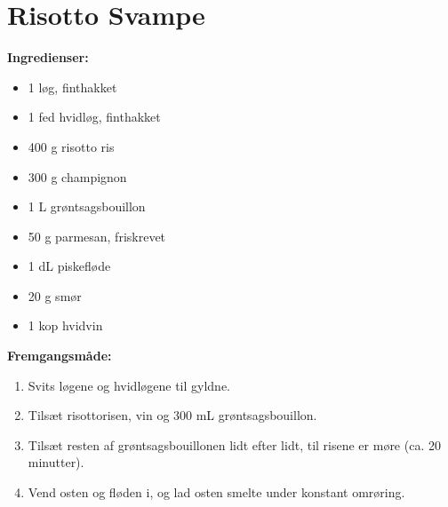 \documentclass{book}
\begin{document}
\section{Risotto Svampe}
\begin{minipage}[t]{0.5\textwidth}
\textbf{Ingredienser:}
\begin{itemize}
    \item 1 løg, finthakket
    \item 1 fed hvidløg, finthakket
    \item 400 g risotto ris
    \item 300 g champignon
    \item 1 L grøntsagsbouillon
    \item 50 g parmesan, friskrevet
    \item 1 dL piskefløde
    \item 20 g smør
    \item 1 kop hvidvin
\end{itemize}
\end{minipage}
\begin{minipage}[t]{0.5\textwidth}
\textbf{Fremgangsmåde:}
\begin{enumerate}
    \item Svits løgene og hvidløgene til gyldne.
    \item Tilsæt risottorisen, vin og 300 mL grøntsagsbouillon.
    \item Tilsæt resten af grøntsagsbouillonen lidt efter lidt, til risene er møre (ca. 20 minutter).
    \item Vend osten og fløden i, og lad osten smelte under konstant omrøring.
\end{enumerate}
\end{minipage}
\end{document}
